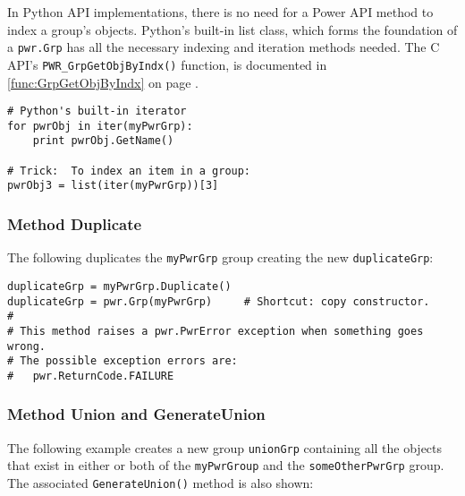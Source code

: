 In Python API implementations, there is no need for a Power API method to index
a group's objects. Python's built-in list class, which forms the foundation of
a \texttt{pwr.Grp} has all the necessary indexing and iteration methods needed.
The C API's \texttt{PWR_GrpGetObjByIndx()} function, is documented in
\ref{func:GrpGetObjByIndx} on page \pageref{func:GrpGetObjByIndx}.

\begin{center}\begin{minipage}{.95\linewidth}\begin{lstlisting}
# Python's built-in iterator
for pwrObj in iter(myPwrGrp):
    print pwrObj.GetName()

# Trick:  To index an item in a group:
pwrObj3 = list(iter(myPwrGrp))[3]
\end{lstlisting}\end{minipage}\end{center}


\subsubsection{Method Duplicate} \label{meth:Duplicate}

The following duplicates the \texttt{myPwrGrp} group creating the new
\texttt{duplicateGrp}:

\begin{center}\begin{minipage}{.95\linewidth}\begin{lstlisting}
duplicateGrp = myPwrGrp.Duplicate()
duplicateGrp = pwr.Grp(myPwrGrp)     # Shortcut: copy constructor.
#
# This method raises a pwr.PwrError exception when something goes wrong.
# The possible exception errors are:
#   pwr.ReturnCode.FAILURE
\end{lstlisting}\end{minipage}\end{center}

\subsubsection{Method Union and GenerateUnion} \label{meth:Union}

The following example creates a new group \texttt{unionGrp} containing all the
objects that exist in either or both of the \texttt{myPwrGroup} and the
\texttt{someOtherPwrGrp} group. The associated \texttt{GenerateUnion()} method is also shown:

